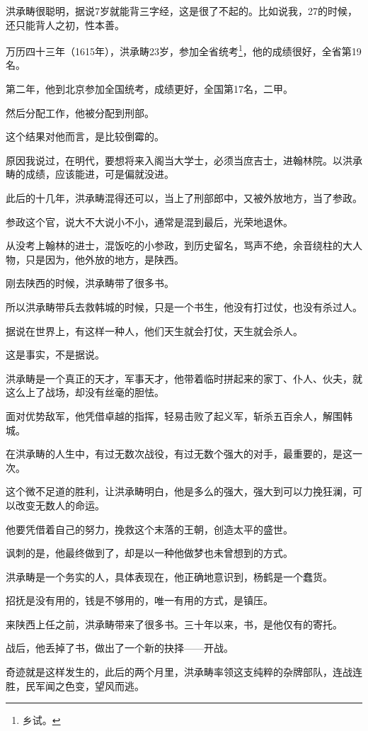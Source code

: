 \begin{multicols}{\theparacolNo}
		洪承畴很聪明，据说7岁就能背三字经，这是很了不起的。比如说我，27的时候，还只能背人之初，性本善。

		万历四十三年（1615年），洪承畴23岁，参加全省统考\footnote{乡试。}，他的成绩很好，全省第19名。

		第二年，他到北京参加全国统考，成绩更好，全国第17名，二甲。

		然后分配工作，他被分配到刑部。

		这个结果对他而言，是比较倒霉的。

		原因我说过，在明代，要想将来入阁当大学士，必须当庶吉士，进翰林院。以洪承畴的成绩，应该能进，可是偏就没进。

		此后的十几年，洪承畴混得还可以，当上了刑部郎中，又被外放地方，当了参政。

		参政这个官，说大不大说小不小，通常是混到最后，光荣地退休。

		从没考上翰林的进士，混饭吃的小参政，到历史留名，骂声不绝，余音绕柱的大人物，只是因为，他外放的地方，是陕西。

		刚去陕西的时候，洪承畴带了很多书。

		所以洪承畴带兵去救韩城的时候，只是一个书生，他没有打过仗，也没有杀过人。

		据说在世界上，有这样一种人，他们天生就会打仗，天生就会杀人。

		这是事实，不是据说。

		洪承畴是一个真正的天才，军事天才，他带着临时拼起来的家丁、仆人、伙夫，就这么上了战场，却没有丝毫的胆怯。

		面对优势敌军，他凭借卓越的指挥，轻易击败了起义军，斩杀五百余人，解围韩城。

		在洪承畴的人生中，有过无数次战役，有过无数个强大的对手，最重要的，是这一次。

		这个微不足道的胜利，让洪承畴明白，他是多么的强大，强大到可以力挽狂澜，可以改变无数人的命运。

		他要凭借着自己的努力，挽救这个末落的王朝，创造太平的盛世。

		讽刺的是，他最终做到了，却是以一种他做梦也未曾想到的方式。

		洪承畴是一个务实的人，具体表现在，他正确地意识到，杨鹤是一个蠢货。

		招抚是没有用的，钱是不够用的，唯一有用的方式，是镇压。

		来陕西上任之前，洪承畴带来了很多书。三十年以来，书，是他仅有的寄托。

		战后，他丢掉了书，做出了一个新的抉择——开战。

		奇迹就是这样发生的，此后的两个月里，洪承畴率领这支纯粹的杂牌部队，连战连胜，民军闻之色变，望风而逃。


\end{multicols}

